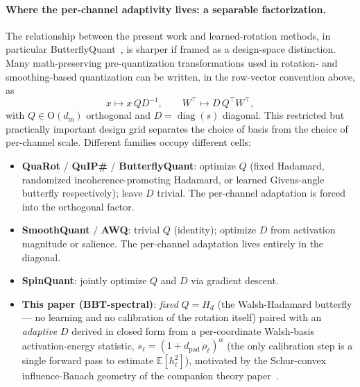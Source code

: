 \documentclass[11pt]{article}
\newcommand{\E}{\mathbb{E}}
\DeclareMathOperator*{\diag}{diag}
\begin{document}
\paragraph{Where the per-channel adaptivity lives: a separable factorization.}
The relationship between the present work and learned-rotation methods, in particular ButterflyQuant~\cite{xu2025butterflyquant}, is sharper if framed as a design-space distinction. Many math-preserving pre-quantization transformations used in rotation- and smoothing-based quantization can be written, in the row-vector convention above, as
\[
    x \mapsto x\, Q D^{-1}, \qquad W^\top \mapsto D\, Q^\top W^\top,
\]
with $Q \in \mathrm{O}(d_{\text{in}})$ orthogonal and $D = \diag(s)$ diagonal. This restricted but practically important design grid separates the choice of basis from the choice of per-channel scale. Different families occupy different cells:
\begin{itemize}
\item \textbf{QuaRot} / \textbf{QuIP\#} / \textbf{ButterflyQuant}: optimize $Q$ (fixed Hadamard, randomized incoherence-promoting Hadamard, or learned Givens-angle butterfly respectively); leave $D$ trivial. The per-channel adaptation is forced into the orthogonal factor.
\item \textbf{SmoothQuant} / \textbf{AWQ}: trivial $Q$ (identity); optimize $D$ from activation magnitude or salience. The per-channel adaptation lives entirely in the diagonal.
\item \textbf{SpinQuant}: jointly optimize $Q$ and $D$ via gradient descent.
\item \textbf{This paper (BBT-spectral)}: \emph{fixed} $Q = H_d$ (the Walsh-Hadamard butterfly --- no learning and no calibration of the rotation itself) paired with an \emph{adaptive} $D$ derived in closed form from a per-coordinate Walsh-basis activation-energy statistic, $s_\ell = (1 + d_{\text{pad}}\, \rho_\ell)^\alpha$ (the only calibration step is a single forward pass to estimate $\E[h_\ell^2]$), motivated by the Schur-convex influence-Banach geometry of the companion theory paper~\cite{bbtTheoryCompanion}.
\end{itemize}
\end{document}
